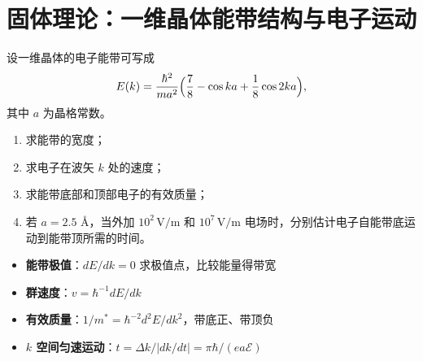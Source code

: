 \section{固体理论：一维晶体能带结构与电子运动}
\label{sec:1d-band-transit-time}

\begin{modelbox}
设一维晶体的电子能带可写成
\[
E(k)=\frac{\hbar^2}{ma^2}\Bigl(\frac{7}{8}-\cos ka+\frac{1}{8}\cos 2ka\Bigr),
\]
其中 $a$ 为晶格常数。
\begin{enumerate}
    \item 求能带的宽度；
    \item 求电子在波矢 $k$ 处的速度；
    \item 求能带底部和顶部电子的有效质量；
    \item 若 $a=2.5$ \AA，当外加 $10^2\,\text{V/m}$ 和 $10^7\,\text{V/m}$ 电场时，分别估计电子自能带底运动到能带顶所需的时间。
\end{enumerate}
\end{modelbox}

\begin{tipbox}[考点快速分析]
\begin{itemize}
    \item \textbf{能带极值}：$dE/dk=0$ 求极值点，比较能量得带宽
    \item \textbf{群速度}：$v=\hbar^{-1}dE/dk$
    \item \textbf{有效质量}：$1/m^*=\hbar^{-2}d^2E/dk^2$，带底正、带顶负
    \item \textbf{$k$ 空间匀速运动}：$t=\Delta k/|dk/dt|=\pi\hbar/(ea\mathcal{E})$
\end{itemize}
\end{tipbox}

